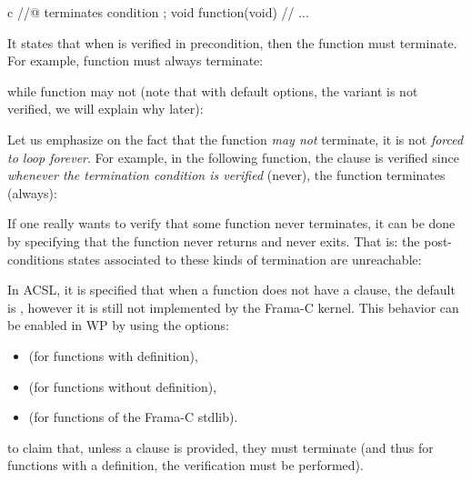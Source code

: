 \begin{CodeBlock}{c}
//@ terminates condition ;
void function(void){
  // ...
}
\end{CodeBlock}



It states that when  is verified in precondition, then
the function must terminate. For example, function  must always
terminate:






while function  may not (note that with default options,
the variant is not verified, we will explain why later):






Let us emphasize on the fact that the function {\em may not} terminate, it is
not {\em forced to loop forever}. For example, in the following function, the
 clause is verified since
{\em whenever the termination condition is verified} (never), the function
terminates (always):






\begin{Information}
  If one really wants to verify that some function never terminates, it can be
  done by specifying that the function never returns and never exits. That is:
  the post-conditions states associated to these kinds of termination are
  unreachable:
\end{Information}



\begin{Information}
  In ACSL, it is specified that when a function does not have a
   clause, the default is
  , however it is still not
  implemented by the Frama-C kernel. This behavior can be enabled in WP
  by using the options:
  \begin{itemize}
  \item {} (for functions with definition),
  \item {} (for functions without definition),
  \item {} (for functions of the Frama-C stdlib).
  \end{itemize}
  to claim that, unless a clause is provided, they must terminate (and thus
  for functions with a definition, the verification must be performed).
\end{Information}



